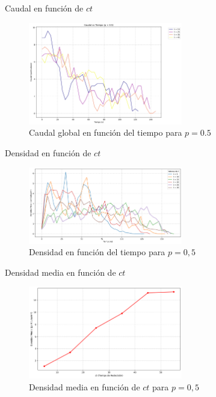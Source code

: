 \documentclass[aspectratio=169]{beamer}
\begin{document}
\begin{frame}{Caudal en función de $ct$}
    \begin{figure}[H]
        \centering
        \includegraphics[width=0.6\textwidth]{img/flow_rates_p0.5.png}
        \caption{Caudal global en función del tiempo para $p=0.5$}
        \label{fig:flow_p100}
    \end{figure}    
\end{frame}

\begin{frame}{Densidad en función de $ct$}
    \begin{figure}[H]
        \centering
        \includegraphics[width=0.6\textwidth]{img/density_vs_time_p0.50.png}
        \caption{Densidad en función del tiempo para $p=0,5$}
        \label{fig:flow_p100}
    \end{figure}    
\end{frame}

\begin{frame}{Densidad media en función de $ct$}
    \begin{figure}[H]
        \centering
        \includegraphics[width=0.6\textwidth]{img/average_density_p0.50.png}
        \caption{Densidad media en función de $ct$ para $p=0,5$}
        \label{fig:flow_p100}
    \end{figure}    
\end{frame}
\end{document}
